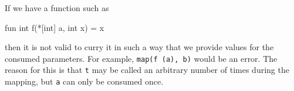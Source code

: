 If we have a function such as
\begin{colorcode}
  fun int f(*[int] a, int x) = x
\end{colorcode}
then it is not valid to curry it in such a way that we provide values
for the consumed parameters.  For example, \texttt{map(f (a), b)}
would be an error.  The reason for this is that \texttt{t} may be
called an arbitrary number of times during the mapping, but \texttt{a}
can only be consumed once.

